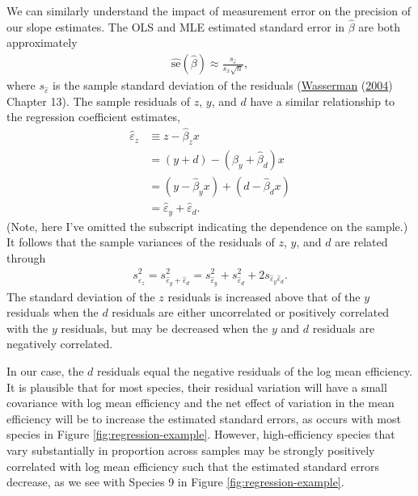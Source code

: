 \documentclass[
]{article}
\theoremstyle{definition}
\theoremstyle{definition}
\theoremstyle{definition}
\theoremstyle{definition}
\theoremstyle{remark}
\begin{document}
We can similarly understand the impact of measurement error on the precision of our slope estimates.
The OLS and MLE estimated standard error in \(\hat \beta\) are both approximately
\begin{align}
  \hat{\text{se}}(\hat \beta)
  \approx \frac{s_{\hat \varepsilon}}{s_x \sqrt{n}},
\end{align}
where \(s_{\hat \varepsilon}\) is the sample standard deviation of the residuals
(\protect\hyperlink{ref-wasserman2004allo}{Wasserman} (\protect\hyperlink{ref-wasserman2004allo}{2004}) Chapter 13).
The sample residuals of \(z\), \(y\), and \(d\) have a similar relationship to the regression coefficient estimates,
\begin{align}
  \hat \varepsilon_z 
    &\equiv z - \hat \beta_z x
  \\&= (y + d) - (\hat \beta_y + \hat \beta_d) x
  \\&= (y - \hat \beta_y x) + (d - \hat \beta_d x)
  \\&= \hat \varepsilon_y + \hat \varepsilon_d.
\end{align}
(Note, here I've omitted the subscript indicating the dependence on the sample.)
It follows that the sample variances of the residuals of \(z\), \(y\), and \(d\) are related through
\begin{align}
  s^2_{\hat \varepsilon_{z}} 
  = s^2_{\hat \varepsilon_{y} + \hat \varepsilon_{d}}
  = s^2_{\hat \varepsilon_{y}} + s^2_{\hat \varepsilon_{d}} + 2 s_{\hat \varepsilon_{y} \hat \varepsilon_{d}}.
\end{align}
The standard deviation of the \(z\) residuals is increased above that of the \(y\) residuals when the \(d\) residuals are either uncorrelated or positively correlated with the \(y\) residuals, but may be decreased when the \(y\) and \(d\) residuals are negatively correlated.

In our case, the \(d\) residuals equal the negative residuals of the log mean efficiency.
It is plausible that for most species, their residual variation will have a small covariance with log mean efficiency and the net effect of variation in the mean efficiency will be to increase the estimated standard errors, as occurs with most species in Figure \ref{fig:regression-example}.
However, high-efficiency species that vary substantially in proportion across samples may be strongly positively correlated with log mean efficiency such that the estimated standard errors decrease, as we see with Species 9 in Figure \ref{fig:regression-example}.
\end{document}
